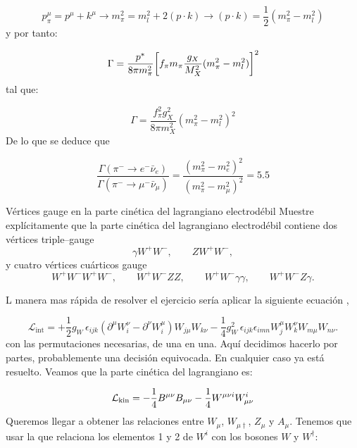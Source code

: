 \begin{equation}
    p_\pi^\mu = p^\mu + k^\mu \to m_\pi^2 = m_l^2 + 2 (p \cdot k) \to (p\cdot k) = \frac{1}{2} (m_\pi^2 - m_l^2)
\end{equation}
y por tanto: 

\begin{equation}
    \Gamma = \frac{p^* }{8\pi m_\pi^2} \bqty{f_\pi m_\pi \frac{g_X}{M_X^2} (m_\pi^2 - m_l^2)}^2
\end{equation}
tal que: 

\begin{equation}
    \Gamma = \frac{f_\pi^2 g_X^2}{8 \pi m_X^2} (m_\pi^2 - m_l^2)^2
\end{equation}
De lo que se deduce que 

\begin{equation}
   \frac{\Gamma(\pi^- \to e^- \bar{\nu}_e)}{\Gamma(\pi^- \to \mu^- \bar{\nu}_\mu)} = \frac{(m_\pi^2 - m_e^2)^2}{(m_\pi^2 - m_\mu^2)^2} = 5.5
\end{equation}



\begin{Ejercicio}{Vértices gauge en la parte cinética del lagrangiano electrodébil}\label{Ej:16}
Muestre explícitamente que la parte cinética del lagrangiano electrodébil contiene dos vértices triple–gauge
\[
\gamma W^+W^-,\qquad ZW^+W^-,
\]
y cuatro vértices cuárticos gauge
\[
W^+W^-W^+W^-,\qquad W^+W^-ZZ,\qquad W^+W^-\gamma\gamma,\qquad W^+W^-Z\gamma.
\]
\end{Ejercicio}
L manera mas rápida de resolver el ejercicio sería aplicar la siguiente ecuación \cite{thomson_modern_physics}, 

\begin{equation}
	\mathcal{L}_{\text{int}} 
	= +\frac{1}{2} g_W \, \epsilon_{ijk} 
	\left( \partial^{\mu} W_i^{\nu} - \partial^{\nu} W_i^{\mu} \right)
	W_{j\mu} W_{k\nu}
	- \frac{1}{4} g_W^2 \, \epsilon_{ijk} \epsilon_{imn}
	W_j^{\mu} W_k^{\nu} W_{m\mu} W_{n\nu}.
\end{equation}
con las permutaciones necesarias, de una en una. Aquí decidimos hacerlo por partes, probablemente una decisión equivocada. En cualquier caso ya está resuelto. Veamos que la parte cinética del lagrangiano es: 

\begin{equation}
	\mathcal{L}_{\text{kin}} = -\frac{1}{4}B^{\mu \nu} B_{\mu \nu} - \frac{1}{4}W^{\mu \nu i} W_{\mu \nu}^i
\end{equation}
Queremos llegar a obtener las relaciones entre $W_{\mu}$, $W_{\mu \dagger}$, $Z_\mu$ y $A_\mu$. Tenemos que usar la que relaciona los elementos 1 y 2  de $W^i$ con los bosones $W$  y $W^\dagger$: 

